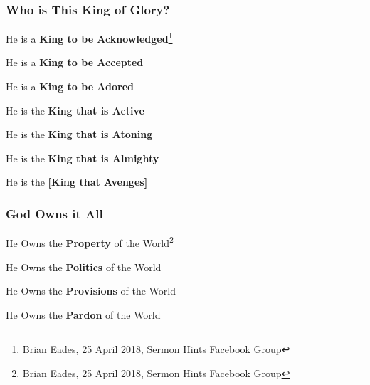 \subsubsection{Who is This King of Glory?}
\begin{compactenum}[I.]
    \item He is a  \textbf{King to be Acknowledged}\footnote{Brian Eades, 25 April 2018, Sermon Hints Facebook Group}
    \item He is a  \textbf{King to be Accepted}
    \item He is a  \textbf{King to be Adored}
    \item He is the  \textbf{King that is Active}
    \item He is the  \textbf{King that is Atoning}
    \item He is the  \textbf{King that is Almighty}
    \item He is the  \textbf{[King that Avenges]}
\end{compactenum}

\subsubsection{God Owns it All}

\begin{compactenum}[I.]
    \item He Owns the  \textbf{Property} of the World\footnote{Brian Eades, 25 April 2018, Sermon Hints Facebook Group}
    \item He Owns the  \textbf{Politics} of the World
    \item He Owns the  \textbf{Provisions} of the World
    \item He Owns the  \textbf{Pardon} of the World
\end{compactenum}
